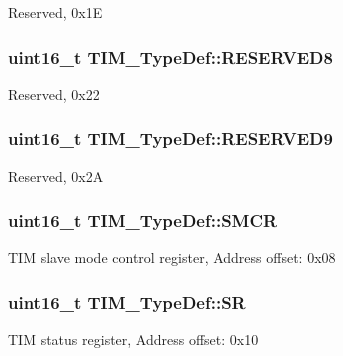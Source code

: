 Reserved, 0x1\-E \hypertarget{struct_t_i_m___type_def_ac708e4f0f142ac14d7e1c46778ed6f96}{
\subsubsection[{R\-E\-S\-E\-R\-V\-E\-D8}]{\setlength{\rightskip}{0pt plus 5cm}uint16\-\_\-t T\-I\-M\-\_\-\-Type\-Def\-::\-R\-E\-S\-E\-R\-V\-E\-D8}}\label{struct_t_i_m___type_def_ac708e4f0f142ac14d7e1c46778ed6f96}
Reserved, 0x22 \hypertarget{struct_t_i_m___type_def_a6754dd714ff0885e8e511977d2f393ce}{
\subsubsection[{R\-E\-S\-E\-R\-V\-E\-D9}]{\setlength{\rightskip}{0pt plus 5cm}uint16\-\_\-t T\-I\-M\-\_\-\-Type\-Def\-::\-R\-E\-S\-E\-R\-V\-E\-D9}}\label{struct_t_i_m___type_def_a6754dd714ff0885e8e511977d2f393ce}
Reserved, 0x2\-A \hypertarget{struct_t_i_m___type_def_a476012f1b4567ffc21ded0b5fd50985e}{
\subsubsection[{S\-M\-C\-R}]{ uint16\-\_\-t T\-I\-M\-\_\-\-Type\-Def\-::\-S\-M\-C\-R}}\label{struct_t_i_m___type_def_a476012f1b4567ffc21ded0b5fd50985e}
T\-I\-M slave mode control register, Address offset\-: 0x08 \hypertarget{struct_t_i_m___type_def_af686e22c1792dc59dfeffe451d47cf13}{
\subsubsection[{S\-R}]{ uint16\-\_\-t T\-I\-M\-\_\-\-Type\-Def\-::\-S\-R}}\label{struct_t_i_m___type_def_af686e22c1792dc59dfeffe451d47cf13}
T\-I\-M status register, Address offset\-: 0x10 

